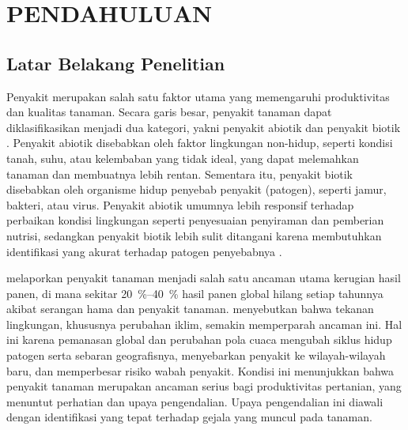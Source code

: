\chapter{PENDAHULUAN}

\section{Latar Belakang Penelitian}
Penyakit merupakan salah satu faktor utama yang memengaruhi produktivitas dan kualitas tanaman. Secara garis besar, penyakit tanaman dapat diklasifikasikan menjadi dua kategori, yakni penyakit abiotik dan penyakit biotik \parencite{bhargavaPlantLeafDisease2024, georgePresentFutureDeep2025, muhammadComprehensiveReviewCrop2025}. Penyakit abiotik disebabkan oleh faktor lingkungan non-hidup, seperti kondisi tanah, suhu, atau kelembaban yang tidak ideal, yang dapat melemahkan tanaman dan membuatnya lebih rentan. Sementara itu, penyakit biotik disebabkan oleh organisme hidup penyebab penyakit (patogen), seperti jamur, bakteri, atau virus. Penyakit abiotik umumnya lebih responsif terhadap perbaikan kondisi lingkungan seperti penyesuaian penyiraman dan pemberian nutrisi, sedangkan penyakit biotik lebih sulit ditangani karena membutuhkan identifikasi yang akurat terhadap patogen penyebabnya \parencite{bhargavaPlantLeafDisease2024}. 

\textcite{fao2020climate} melaporkan penyakit tanaman menjadi salah satu ancaman utama kerugian hasil panen, di mana sekitar \qtyrange{20}{40}{\percent} hasil panen global hilang setiap tahunnya akibat serangan hama dan penyakit tanaman. \textcite{gullinoPositioningPlantHealth2024} menyebutkan bahwa tekanan lingkungan, khususnya perubahan iklim, semakin memperparah ancaman ini. Hal ini karena pemanasan global dan perubahan pola cuaca mengubah siklus hidup patogen serta sebaran geografisnya, menyebarkan penyakit ke wilayah-wilayah baru, dan memperbesar risiko wabah penyakit. Kondisi ini menunjukkan bahwa penyakit tanaman merupakan ancaman serius bagi produktivitas pertanian, yang menuntut perhatian dan upaya pengendalian. Upaya pengendalian ini diawali dengan identifikasi yang tepat terhadap gejala yang muncul pada tanaman.

